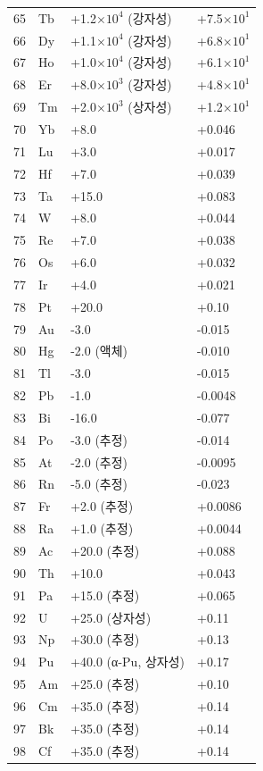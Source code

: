 \documentclass[12pt,a4paper]{article}
\begin{document}
\begin{longtable}{p{0.6cm}p{1.2cm}p{2.5cm}p{2.5cm}}
		65 & Tb & +1.2\(\times10^4\) (강자성) & +7.5\(\times10^1\) \\
		66 & Dy & +1.1\(\times10^4\) (강자성) & +6.8\(\times10^1\) \\
		67 & Ho & +1.0\(\times10^4\) (강자성) & +6.1\(\times10^1\) \\
		68 & Er & +8.0\(\times10^3\) (강자성) & +4.8\(\times10^1\) \\
		69 & Tm & +2.0\(\times10^3\) (상자성) & +1.2\(\times10^1\) \\
		70 & Yb & +8.0 & +0.046 \\
		71 & Lu & +3.0 & +0.017 \\
		72 & Hf & +7.0 & +0.039 \\
		73 & Ta & +15.0 & +0.083 \\
		74 & W  & +8.0 & +0.044 \\
		75 & Re & +7.0 & +0.038 \\
		76 & Os & +6.0 & +0.032 \\
		77 & Ir & +4.0 & +0.021 \\
		78 & Pt & +20.0 & +0.10 \\
		79 & Au & -3.0 & -0.015 \\
		80 & Hg & -2.0 (액체) & -0.010 \\
		81 & Tl & -3.0 & -0.015 \\
		82 & Pb & -1.0 & -0.0048 \\
		83 & Bi & -16.0 & -0.077 \\
		84 & Po & -3.0 (추정) & -0.014 \\
		85 & At & -2.0 (추정) & -0.0095 \\
		86 & Rn & -5.0 (추정) & -0.023 \\
		87 & Fr & +2.0 (추정) & +0.0086 \\
		88 & Ra & +1.0 (추정) & +0.0044 \\
		89 & Ac & +20.0 (추정) & +0.088 \\
		90 & Th & +10.0 & +0.043 \\
		91 & Pa & +15.0 (추정) & +0.065 \\
		92 & U  & +25.0 (상자성) & +0.11 \\
		93 & Np & +30.0 (추정) & +0.13 \\
		94 & Pu & +40.0 (α-Pu, 상자성) & +0.17 \\
		95 & Am & +25.0 (추정) & +0.10 \\
		96 & Cm & +35.0 (추정) & +0.14 \\
		97 & Bk & +35.0 (추정) & +0.14 \\
		98 & Cf & +35.0 (추정) & +0.14 \\

\end{longtable}
\end{document}

